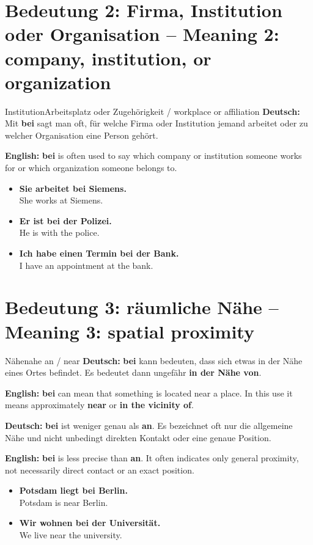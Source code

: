 \documentclass[a4paper,11pt]{article}
\newcommand{\GermanText}[1]{\textbf{Deutsch: }#1\par}
\newcommand{\EnglishText}[1]{{\small\color{SoftGray}\textbf{English: }#1\par}}
\newcommand{\ExampleItem}[2]{\item \textbf{#1}\\{\small\color{SoftGray}#2}}
\begin{document}
   \section{Bedeutung 2: Firma, Institution oder Organisation -- Meaning 2: company, institution, or organization}
            \begin{grammarentry}{Institution}{Arbeitsplatz oder Zugehörigkeit / workplace or affiliation}
               \GermanText{Mit \textbf{bei} sagt man oft, für welche Firma oder Institution jemand arbeitet oder zu welcher Organisation eine Person gehört.}
               \EnglishText{\textbf{bei} is often used to say which company or institution someone works for or which organization someone belongs to.}
            \end{grammarentry}
            \begin{exbox}\begin{itemize}
               \ExampleItem{Sie arbeitet bei Siemens.}{She works at Siemens.}
               \ExampleItem{Er ist bei der Polizei.}{He is with the police.}
               \ExampleItem{Ich habe einen Termin bei der Bank.}{I have an appointment at the bank.}
               \end{itemize}\end{exbox}

   \section{Bedeutung 3: räumliche Nähe -- Meaning 3: spatial proximity}
               \begin{grammarentry}{Nähe}{nahe an / near}
                  \GermanText{\textbf{bei} kann bedeuten, dass sich etwas in der Nähe eines Ortes befindet. Es bedeutet dann ungefähr \textbf{in der Nähe von}.}
                  \EnglishText{\textbf{bei} can mean that something is located near a place. In this use it means approximately \textbf{near} or \textbf{in the vicinity of}.}
                  \GermanText{\textbf{bei} ist weniger genau als \textbf{an}. Es bezeichnet oft nur die allgemeine Nähe und nicht unbedingt direkten Kontakt oder eine genaue Position.}
                  \EnglishText{\textbf{bei} is less precise than \textbf{an}. It often indicates only general proximity, not necessarily direct contact or an exact position.}
               \end{grammarentry}
               \begin{exbox}\begin{itemize}
                  \ExampleItem{Potsdam liegt bei Berlin.}{Potsdam is near Berlin.}
                  \ExampleItem{Wir wohnen bei der Universität.}{We live near the university.}
                  \end{itemize}\end{exbox}
\end{document}
